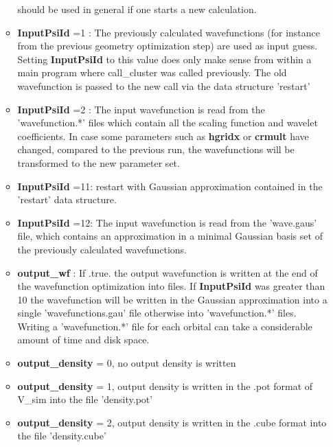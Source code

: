 \documentclass[a4paper,11pt]{report}
\begin{document}
\begin{itemize}
\begin{itemize}
                                    should be used in general if one starts a new calculation. 
       \item {\bf InputPsiId } =1 : The previously calculated wavefunctions (for instance from the previous 
                                    geometry optimization step) are used as input guess. Setting {\bf InputPsiId } to 
                                    this value does only make sense from within a main program where call\_cluster was 
                                    called previously. The old wavefunction is passed to the new call via the data structure 'restart'
       \item {\bf InputPsiId } =2 : The input wavefunction is read from the 'wavefunction.*' files which contain all the 
                                    scaling function and wavelet coefficients. In case some parameters such as {\bf hgridx} 
                                    or {\bf crmult} have changed, compared to the previous run, the wavefunctions will be 
                                    transformed to the new parameter set.
       \item {\bf InputPsiId } =11: restart with Gaussian approximation contained in the 'restart' data structure.
       \item {\bf InputPsiId } =12: The input wavefunction is read from the 'wave.gaus'  file, which contains an 
                                    approximation in a minimal Gaussian basis set of the previously calculated wavefunctions.
       \item {\bf output\_wf} : If .true. the output wavefunction is written at the end of the wavefunction optimization 
                               into files. If {\bf InputPsiId } was greater than 10 the wavefunction will be written 
                               in the Gaussian approximation into  a single 'wavefunctions.gau' file otherwise into 
                               'wavefunction.*' files. Writing a  'wavefunction.*' file for each orbital can take a considerable 
                               amount of time and disk space. 
       \item {\bf output\_density} = 0, no output density is written
       \item {\bf output\_density} = 1, output density is written in the .pot format of V\_sim into the file 'density.pot'
       \item {\bf output\_density} = 2, output density is written in the .cube format into the file 'density.cube'
      \end{itemize}

\end{itemize}
\end{document}
